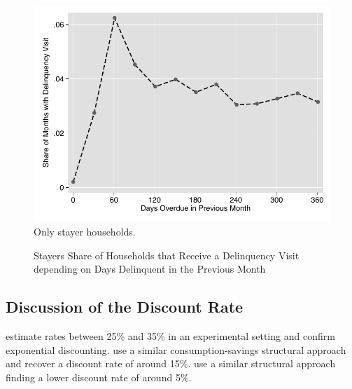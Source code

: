 \documentclass[12pt]{article}
\begin{document}
\begin{figure}[H]
\centering
\caption{Stayers Share of Households that Receive a Delinquency Visit \\ depending on Days Delinquent in the Previous Month}\label{figure:dc_hazardstayers}
\includegraphics[scale=.7]{tables/connected_visit_hazard.pdf} \\
{ \footnotesize Only stayer households. }
\end{figure}

\subsection{Discussion of the Discount Rate}

\cite{andreoni2012estimating} estimate rates between 25\% and 35\% in an experimental setting and confirm exponential discounting.  \cite{laibson2007estimating} use a similar consumption-savings structural approach and recover a discount rate of around 15\%.  \cite{gourinchas2002consumption} use a similar structural approach finding a lower discount rate of around 5\%.


\nocite{*}
\singlespacing
\setlength{\bibsep}{7pt}


\end{document}
